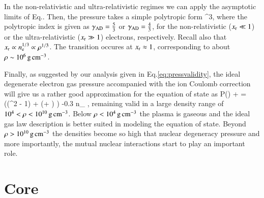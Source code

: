 In the non-relativistic and ultra-relativistic regimes we can apply the asymptotic limits of Eq..
Then, the pressure  takes a simple polytropic form
\be
\Peid \approx \frac{ \Pressr }{9\pi^2 \gammaad} \xr^{3\gammaad},
\ee
where the polytropic index is given as $\gamma_{\mathrm{AD}} = \frac{5}{3}$ or $\gamma_{\mathrm{AD}} = \frac{4}{3}$, for the non-relativistic ($x_{\mathrm{r}} \ll 1$) or the ultra-relativistic ($x_{\mathrm{r}} \gg 1$) electrons, respectively.
Recall also that $x_{\mathrm{r}} \propto n_{\mathrm{e}}^{1/3} \propto \rho^{1/3}$.
The transition occures at $x_{\mathrm{r}} \approx 1$, corresponding to about $\rho \sim 10^6 \, \mathrm{g}\,\mathrm{cm}^{-3}$.

Finally, as suggested by our analysis given in Eq.\eqref{eq:pressvalidity}, the ideal degenerate electron gas pressure accompanied with the ion Coulomb correction will give us a rather good approximation for the equation of state as %
\be
P(\xr) \approx \Peid + \Pii =  \left(\xr (\xr^2 - 1) \gammar + \ln(\xr + \gammar) \right) -0.3 n_{} ,
\ee
remaining valid in a large density range of $10^{4} < \rho < 10^{10} \, \mathrm{g}\,\mathrm{cm}^{-3}$.
Below $\rho < 10^{4} \, \mathrm{g}\,\mathrm{cm}^{-3}$ the plasma is gaseous and the ideal gas law description  is better suited in modeling the equation of state.
Beyond $\rho > 10^{10} \, \mathrm{g}\,\mathrm{cm}^{-3}$ the densities become so high that nuclear degeneracy pressure and more importantly, the mutual nuclear interactions start to play an important role.


%







\section{Core}\label{sect:core}

